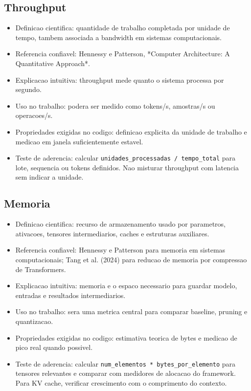 \subsection{Throughput}


\begin{itemize}
\item Definicao cientifica: quantidade de trabalho completada por unidade de tempo,
tambem associada a bandwidth em sistemas computacionais.
\item Referencia confiavel: Hennessy e Patterson, *Computer Architecture: A
Quantitative Approach*.
\item Explicacao intuitiva: throughput mede quanto o sistema processa por segundo.
\item Uso no trabalho: podera ser medido como tokens/s, amostras/s ou operacoes/s.
\item Propriedades exigidas no codigo: definicao explicita da unidade de trabalho e
medicao em janela suficientemente estavel.
\item Teste de aderencia: calcular \texttt{unidades\_\allowbreak{}processadas /\allowbreak{} tempo\_\allowbreak{}total} para lote,
sequencia ou tokens definidos. Nao misturar throughput com latencia sem
indicar a unidade.
\end{itemize}


\subsection{Memoria}


\begin{itemize}
\item Definicao cientifica: recurso de armazenamento usado por parametros,
ativacoes, tensores intermediarios, caches e estruturas auxiliares.
\item Referencia confiavel: Hennessy e Patterson para memoria em sistemas
computacionais; Tang et al. (2024) para reducao de memoria por compressao de
Transformers.
\item Explicacao intuitiva: memoria e o espaco necessario para guardar modelo,
entradas e resultados intermediarios.
\item Uso no trabalho: sera uma metrica central para comparar baseline, pruning e
quantizacao.
\item Propriedades exigidas no codigo: estimativa teorica de bytes e medicao de
pico real quando possivel.
\item Teste de aderencia: calcular \texttt{num\_\allowbreak{}elementos * bytes\_\allowbreak{}por\_\allowbreak{}elemento} para
tensores relevantes e comparar com medidores de alocacao do framework. Para
KV cache, verificar crescimento com o comprimento do contexto.
\end{itemize}


